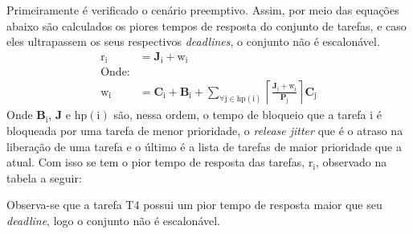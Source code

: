 \documentclass[
	10pt,				%
	openright,			%
	oneside,			%
	a4paper,			%
	english,			%
	french,				%
	spanish,			%
	brazil,				%
	]{abntex2}
\newcommand{\ª}{%
\textordfeminine
}
\begin{document}
\begin{enumerate}
Primeiramente é verificado o cenário preemptivo. Assim, por meio das equações abaixo \cite[p. 3]{tindell1994} são calculados os piores tempos de resposta do conjunto de tarefas, e caso eles ultrapassem os seus respectivos \textit{deadlines}, o conjunto não é escalonável.
\begin{align}
	\mathrm{r_{i}} &= \mathbf{J}_{\mathrm{i}} + \mathrm{w_{i}} \label{eq_3} \\
	\text{Onde:} & \nonumber \\
	\mathrm{w_{i}} &= \mathbf{C}_{\mathrm{i}} + \mathbf{B}_{\mathrm{i}} + \sum_{\forall \mathrm{j} \in \mathrm{hp(i)}}{\left\lceil \frac{\mathbf{J}_{\mathrm{j}} + \mathrm{w_{i}}}{\mathbf{P}_{\mathrm{j}}} \right\rceil \mathbf{C}_{\mathrm{j}}} \label{eq_4}
\end{align}
Onde $\mathbf{B}_{\mathrm{i}}$, $\mathbf{J}$ e $\mathrm{hp(i)}$ são, nessa ordem, o tempo de bloqueio que a tarefa i é bloqueada por uma tarefa de menor prioridade, o \textit{release jitter} que é o atraso na liberação de uma tarefa e o último é a lista de tarefas de maior prioridade que a atual. Com isso se tem o pior tempo de resposta das tarefas, $\mathrm{r_{i}}$, observado na tabela a seguir:
\begin{center}
\end{center}
Observa-se que a tarefa T4 possui um pior tempo de resposta maior que seu \textit{deadline}, logo o conjunto não é escalonável.


\end{enumerate}
\end{document}
